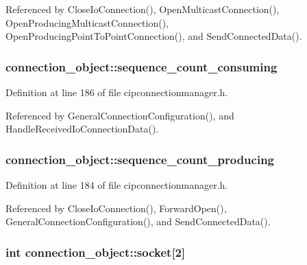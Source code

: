 \-Referenced by \-Close\-Io\-Connection(), \-Open\-Multicast\-Connection(), \-Open\-Producing\-Multicast\-Connection(), \-Open\-Producing\-Point\-To\-Point\-Connection(), and \-Send\-Connected\-Data().

\hypertarget{structconnection__object_ad6c06f4b33c7bea685145806c86d2c3f}{
\subsubsection[{sequence\-\_\-count\-\_\-consuming}]{ {\bf connection\-\_\-object\-::sequence\-\_\-count\-\_\-consuming}}}\label{d1/d48/structconnection__object_ad6c06f4b33c7bea685145806c86d2c3f}


\-Definition at line 186 of file cipconnectionmanager.\-h.



\-Referenced by \-General\-Connection\-Configuration(), and \-Handle\-Received\-Io\-Connection\-Data().

\hypertarget{structconnection__object_a3bdc60cec812eb1fa09d731971c28c59}{
\subsubsection[{sequence\-\_\-count\-\_\-producing}]{ {\bf connection\-\_\-object\-::sequence\-\_\-count\-\_\-producing}}}\label{d1/d48/structconnection__object_a3bdc60cec812eb1fa09d731971c28c59}


\-Definition at line 184 of file cipconnectionmanager.\-h.



\-Referenced by \-Close\-Io\-Connection(), \-Forward\-Open(), \-General\-Connection\-Configuration(), and \-Send\-Connected\-Data().

\hypertarget{structconnection__object_af79cffac5d391cb48b836dca8b893fe4}{
\subsubsection[{socket}]{\setlength{\rightskip}{0pt plus 5cm}int {\bf connection\-\_\-object\-::socket}\mbox{[}2\mbox{]}}}\label{d1/d48/structconnection__object_af79cffac5d391cb48b836dca8b893fe4}


